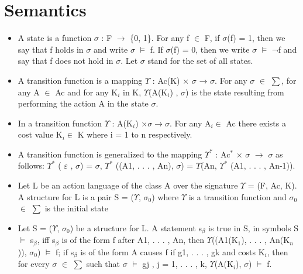 \documentclass[11pt]{article}
\begin{document}
	\section{Semantics}
	\begin{itemize}
\item 	A state is a function $\sigma$ : F $\rightarrow$ \{0, 1\}. For any f $\in$ F, if $\sigma$(f) = 1, then we say that f holds in $\sigma$ and write $\sigma$   $\vDash$   f. If $\sigma$(f) = 0, then we write $\sigma$   $\vDash$   ¬f and say that f does not hold in $\sigma$. Let $\sigma$ stand for the set of all states.

\item 	A transition function is a mapping $\Upsilon$ : Ac(K) $\times$ $\sigma$ → $\sigma$. For any $\sigma$ $\in$ $\sum$, for any A $\in$ Ac and for any K$_{i}$ in K, $\Upsilon$(A(K$_{i}$) , $\sigma$) is the state resulting from performing the action A in the state $\sigma$.

\item  In a transition function $\Upsilon$ : A(K$_{i}$) $\times \sigma \rightarrow \sigma$. For any A$_{i} \in$ Ac there exists a cost value K$_{i} \in$ K  where i = 1 to n respectively. 

\item 	A transition function is generalized to the mapping $\Upsilon^{\ast}$ : Ac$^{\ast}$  $\times$  $\sigma$ $\rightarrow$ $\sigma$ as follows: 
$\Upsilon^{\ast}$ ( $\varepsilon$ , $\sigma$) = $\sigma$, $\Upsilon^{\ast}$ ((A1, . . . , An), $\sigma$) = $\Upsilon$(An, $\Upsilon^{\ast}$ (A1, . . . , An-1)).


\item 	Let L be an action language of the class A over the signature $\Upsilon$ = (F, Ac, K). A structure for L is a pair S = ($\Upsilon$, $\sigma_{0}$) where $\Upsilon$ is a transition function and $\sigma_{0}$ $\in$ $\sum$ is the initial state

\item 	Let S = ($\Upsilon$, $\sigma_{0}$) be a structure for L. A statement s$_{\beta}$ is true in S, in symbols S   $\vDash$   s$_{\beta}$, iff s$_{\beta}$ is of the form f after A1, . . . , An, then $\Upsilon$((A1(K$_{1}$), . . . , An(K$_{n}$)), $\sigma_{0}$)   $\vDash$   f; if s$_{\beta}$ is of the form A causes f if g1, . . . , gk and costs K$_{i}$, then for every $\sigma$ $\in$ $\sum$ such that $\sigma$   $\vDash$   gj , j = 1, . . . , k, $\Upsilon$(A(K$_{i}$), $\sigma$)   $\vDash$   f.

\end{itemize}
\end{document}
